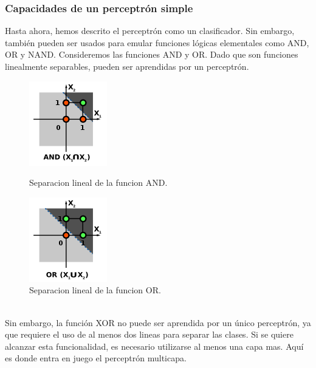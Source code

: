 \subsubsection{Capacidades de un perceptrón simple}
Hasta ahora, hemos descrito el perceptrón como un clasificador. Sin embargo, también pueden ser usados para emular funciones lógicas elementales como AND, OR y NAND. Consideremos las funciones AND y OR. Dado que son funciones linealmente separables, pueden ser aprendidas por un perceptrón.
\begin{figure}[htp]
\centering
\begin{minipage}[b]{0.4\textwidth}
    \includegraphics[scale=1]{images/perceptron_and.png}
    \caption{Separacion lineal de la funcion AND.}
  \end{minipage}
\hfill
\begin{minipage}[b]{0.4\textwidth}
    \includegraphics[scale=1]{images/perceptron_or.png}
  \caption{Separacion lineal de la funcion OR.}
  \end{minipage}
\end{figure}
\\Sin embargo, la función XOR no puede ser aprendida por un único perceptrón, ya que requiere el uso de al menos dos lineas para separar las clases. Si se quiere alcanzar esta funcionalidad, es necesario utilizarse al menos una capa mas. Aquí es donde entra en juego el perceptrón multicapa.

